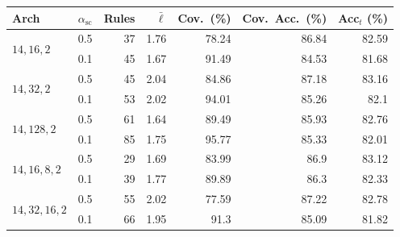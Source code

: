 \begin{tabular}{llrrrrr}
\toprule
Arch & $\alpha_{\mathrm{sc}}$ & Rules & $\bar{\ell}$ & Cov.\ (\%) & Cov.\ Acc.\ (\%) & Acc$_t$ (\%) \\
\midrule
\multirow{2}{*}{${14, 16, 2}$} & 0.5 & 37 & 1.76 & 78.24 & 86.84 & 82.59 \\
 & 0.1 & 45 & 1.67 & 91.49 & 84.53 & 81.68 \\
\midrule
\multirow{2}{*}{${14, 32, 2}$} & 0.5 & 45 & 2.04 & 84.86 & 87.18 & 83.16 \\
 & 0.1 & 53 & 2.02 & 94.01 & 85.26 & 82.1 \\
\midrule
\multirow{2}{*}{${14, 128, 2}$} & 0.5 & 61 & 1.64 & 89.49 & 85.93 & 82.76 \\
 & 0.1 & 85 & 1.75 & 95.77 & 85.33 & 82.01 \\
\midrule
\multirow{2}{*}{${14, 16, 8, 2}$} & 0.5 & 29 & 1.69 & 83.99 & 86.9 & 83.12 \\
 & 0.1 & 39 & 1.77 & 89.89 & 86.3 & 82.33 \\
\midrule
\multirow{2}{*}{${14, 32, 16, 2}$} & 0.5 & 55 & 2.02 & 77.59 & 87.22 & 82.78 \\
 & 0.1 & 66 & 1.95 & 91.3 & 85.09 & 81.82 \\
\bottomrule
\end{tabular}
